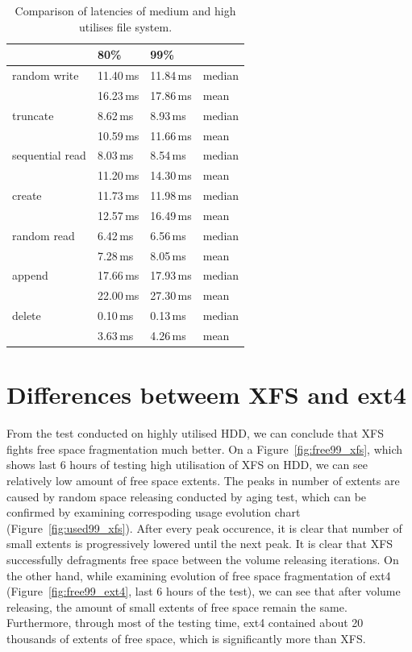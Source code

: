 \documentclass[
  color, %
  table, %
  lof,   %
  lot,   %
]{fithesis3}
\begin{document}
\clearpage

\begin{table}
\centering
\begin{tabular}{|l|l|l|l|}
\hline
 &80\% & 99\% &  \\
\hline
    random write & 11.40\,ms & 11.84\,ms & median \\
 \hline
                 & 16.23\,ms & 17.86\,ms& mean\\
    \hline
        truncate & 8.62\,ms & 8.93\,ms & median\\
    \hline
                 &  10.59\,ms & 11.66\,ms & mean \\
    \hline
           sequential read &  8.03\,ms & 8.54\,ms & median\\
    \hline
                 & 11.20\,ms & 14.30\,ms & mean \\
    \hline
          create & 11.73\,ms & 11.98\,ms & median\\
    \hline
                 & 12.57\,ms & 16.49\,ms & mean \\
    \hline
     random read & 6.42\,ms &6.56\,ms& median\\
    \hline
                 & 7.28\,ms & 8.05\,ms & mean \\
    \hline
          append & 17.66\,ms & 17.93\,ms & median\\
    \hline
                 & 22.00\,ms & 27.30\,ms & mean \\
    \hline
          delete & 0.10\,ms & 0.13\,ms & median\\
    \hline
                & 3.63\,ms & 4.26\,ms & mean \\
    \hline
\end{tabular}
\caption{Comparison of latencies of medium and high utilises file system.}
\label{tab:99_vs_80}
\end{table}


\section{Differences betweem XFS and ext4}
From the test conducted on highly utilised  HDD, we can conclude that  XFS fights free space fragmentation much better. On a Figure~\ref{fig:free99_xfs}, which shows last 6 hours of testing high utilisation of XFS on HDD, we can see relatively low amount of free space extents. The peaks in number of extents are caused by random space releasing conducted by aging test, which can be confirmed by examining correspoding usage evolution chart (Figure~\ref{fig:used99_xfs}). After every peak occurence, it is clear that number of small extents is progressively lowered until the next peak. It is clear that XFS successfully defragments free space between the volume releasing iterations. On the other hand, while examining evolution of free space fragmentation of ext4 (Figure~\ref{fig:free99_ext4}, last 6 hours of the test), we can see that after volume releasing, the amount of small extents of free space remain the same. Furthermore, through most of the testing time, ext4 contained about 20 thousands of extents of free space, which is significantly more than XFS.
\end{document}
